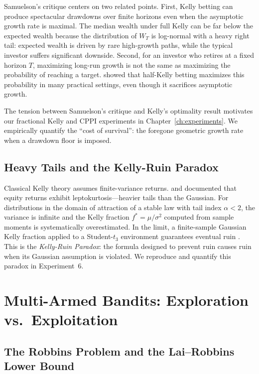 Samuelson's critique centers on two related points.  First, Kelly betting can
produce spectacular drawdowns over finite horizons even when the asymptotic
growth rate is maximal.  The median wealth under full Kelly can be far below
the expected wealth because the distribution of $W_T$ is log-normal with a
heavy right tail: expected wealth is driven by rare high-growth paths, while
the typical investor suffers significant downside.  Second, for an investor
who retires at a fixed horizon $T$, maximizing long-run growth is not the same
as maximizing the probability of reaching a target.  \citet{thorp2008} showed
that half-Kelly betting maximizes this probability in many practical settings,
even though it sacrifices asymptotic growth.

The tension between Samuelson's critique and Kelly's optimality result
motivates our fractional Kelly and CPPI experiments in
Chapter~\ref{ch:experiments}.  We empirically quantify the ``cost of
survival'': the foregone geometric growth rate when a drawdown floor is
imposed.

\subsection{Heavy Tails and the Kelly-Ruin Paradox}

Classical Kelly theory assumes finite-variance returns.  \citet{mandelbrot1963variation} and
\citet{fama1965behavior} documented that equity returns exhibit leptokurtosis---heavier
tails than the Gaussian.  For distributions in the domain of attraction of a
stable law with tail index $\alpha < 2$, the variance is infinite and the Kelly
fraction $f^* = \mu/\sigma^2$ computed from sample moments is systematically
overestimated.  In the limit, a finite-sample Gaussian Kelly fraction applied
to a Student-$t_3$ environment guarantees eventual ruin \citep{ziemba1986beat}.  This is the \emph{Kelly-Ruin Paradox}: the formula designed to prevent
ruin causes ruin when its Gaussian assumption is violated.  We reproduce and
quantify this paradox in Experiment~6.

\section{Multi-Armed Bandits: Exploration vs.\ Exploitation}

\subsection{The Robbins Problem and the Lai--Robbins Lower Bound}

